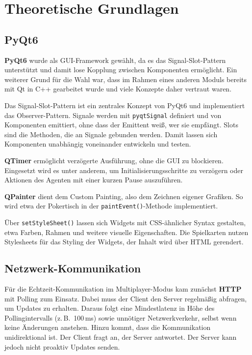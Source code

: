 \section{Theoretische Grundlagen}\label{sec:hintergrund}


\subsection{PyQt6}

\textbf{PyQt6} wurde als GUI-Framework gewählt, da es das Signal-Slot-Pattern unterstützt und damit lose Kopplung zwischen Komponenten ermöglicht.
Ein weiterer Grund für die Wahl war, dass im Rahmen eines anderen Moduls bereits mit Qt in C++ gearbeitet wurde und viele Konzepte daher vertraut waren.

Das Signal-Slot-Pattern ist ein zentrales Konzept von PyQt6 und implementiert das Observer-Pattern.
Signale werden mit \texttt{pyqtSignal} definiert und von Komponenten emittiert, ohne dass der Emittent weiß, wer sie empfängt.
Slots sind die Methoden, die an Signale gebunden werden.
Damit lassen sich Komponenten unabhängig voneinander entwickeln und testen.

\textbf{QTimer} ermöglicht verzögerte Ausführung, ohne die GUI zu blockieren.
Eingesetzt wird es unter anderem, um Initialisierungsschritte zu verzögern oder Aktionen des Agenten mit einer kurzen Pause auszuführen.

\textbf{QPainter} dient dem Custom Painting, also dem Zeichnen eigener Grafiken.
So wird etwa der Pokertisch in der \texttt{paintEvent()}-Methode implementiert.

Über \texttt{setStyleSheet()} lassen sich Widgets mit CSS-ähnlicher Syntax gestalten, etwa Farben, Rahmen und weitere visuelle Eigenschaften.
Die Spielkarten nutzen Stylesheets für das Styling der Widgets, der Inhalt wird über HTML gerendert.

\subsection{Netzwerk-Kommunikation}

Für die Echtzeit-Kommunikation im Multiplayer-Modus kam zunächst \textbf{HTTP} mit Polling zum Einsatz.
Dabei muss der Client den Server regelmäßig abfragen, um Updates zu erhalten.
Daraus folgt eine Mindestlatenz in Höhe des Pollingintervalls (z.\,B.\ 100\,ms) sowie unnötiger Netzwerkverkehr, selbst wenn keine Änderungen anstehen.
Hinzu kommt, dass die Kommunikation unidirektional ist.
Der Client fragt an, der Server antwortet.
Der Server kann jedoch nicht proaktiv Updates senden.

